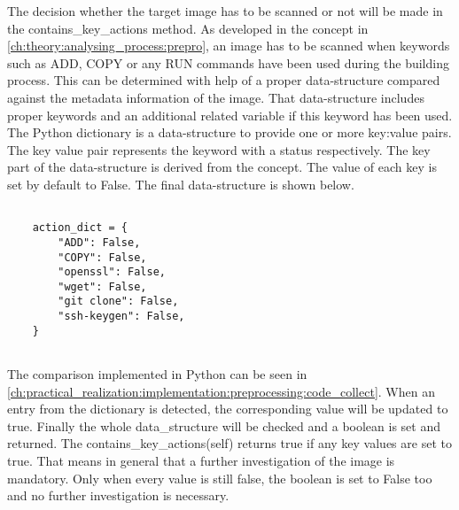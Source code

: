 The decision whether the target image has to be scanned or not will be made in the contains\_key\_actions method. 
As developed in the concept in \ref{ch:theory:analysing_process:prepro}, an image has to be scanned when keywords such as ADD, COPY or any RUN commands have been used during the building process.
This can be determined with help of a proper data-structure compared against the metadata information of the image.
That data-structure includes proper keywords and an additional related variable if this keyword has been used.
The Python dictionary is a data-structure to provide one or more key:value pairs. The key value pair represents the keyword with a status respectively.
The key part of the data-structure is derived from the concept. The value of each key is set by default to False. The final data-structure is shown below.
\lstset{language=Python}          %
\begin{lstlisting}[]  % Start your code-block
	
    action_dict = {
        "ADD": False,
        "COPY": False,
        "openssl": False,
        "wget": False,
        "git clone": False,
        "ssh-keygen": False,
    }
    
\end{lstlisting}
The comparison implemented in Python can be seen in \ref{ch:practical_realization:implementation:preprocessing:code_collect}. When an entry from the dictionary is detected, the corresponding value will be updated to true.
Finally the whole data\_structure will be checked and a boolean is set and returned. The contains\_key\_actions(self) returns true if any key values are set to true. That means in general that a further investigation of the image is mandatory. Only when every value is still false, the boolean is set to False too and no further investigation is necessary.


